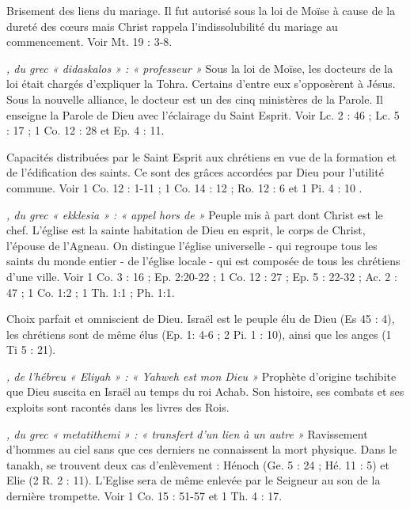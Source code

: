 \begin{multicols}{2}
\textit{}\newline
Brisement des liens du mariage. Il fut autorisé sous la loi de Moïse à cause de la dureté des cœurs mais Christ rappela l'indissolubilité du mariage au commencement. Voir Mt. 19 : 3-8.

\textit{, du grec « didaskalos » : « professeur »}\newline
Sous la loi de Moïse, les docteurs de la loi était chargés d'expliquer la Tohra. Certains d’entre eux s'opposèrent à Jésus. Sous la nouvelle alliance, le docteur est un des cinq ministères de la Parole. Il enseigne la Parole de Dieu avec l'éclairage du Saint Esprit. Voir Lc. 2 : 46 ; Lc. 5 : 17 ; 1 Co. 12 : 28 et Ep. 4 : 11.

\textit{}\newline
Capacités distribuées par le Saint Esprit aux chrétiens en vue de la formation et de l'édification des saints. Ce sont des grâces accordées par Dieu pour l’utilité commune. Voir 1 Co. 12 : 1-11 ; 1 Co. 14 : 12 ; Ro. 12 : 6 et 1 Pi. 4 : 10 .

\textit{, du grec « ekklesia » : « appel hors de »}\newline
Peuple mis à part dont Christ est le chef. L’église est la sainte habitation de Dieu en esprit, le corps de Christ, l’épouse de l’Agneau. On distingue l’église universelle - qui regroupe tous les saints du monde entier - de l’église locale - qui est composée de tous les chrétiens d'une ville. Voir 1 Co. 3 : 16 ; Ep. 2:20-22 ; 1 Co. 12 : 27 ; Ep. 5 : 22-32 ; Ac. 2 : 47 ; 1 Co. 1:2 ; 1 Th. 1:1 ; Ph. 1:1.

\textit{}\newline
Choix parfait et omniscient de Dieu. Israël est le peuple élu de Dieu (Es 45 : 4), les chrétiens sont de même élus (Ep. 1: 4-6 ; 2 Pi. 1 : 10), ainsi que les anges (1 Ti 5 : 21).

\textit{, de l’hébreu « Eliyah » : « Yahweh est mon Dieu »}\newline
Prophète d’origine tschibite que Dieu suscita en Israël au temps du roi Achab. Son histoire, ses combats et ses exploits sont racontés dans les livres des Rois.

\textit{, du grec « metatithemi » : « transfert d’un lien à un autre »}\newline
Ravissement d'hommes au ciel sans que ces derniers ne connaissent la mort physique. Dans le tanakh, se trouvent deux cas d'enlèvement : Hénoch (Ge. 5 : 24 ; Hé. 11 : 5) et Elie (2 R. 2 : 11). L'Eglise sera de même enlevée par le Seigneur au son de la dernière trompette. Voir 1 Co. 15 : 51-57 et 1 Th. 4 : 17.


\end{multicols}
